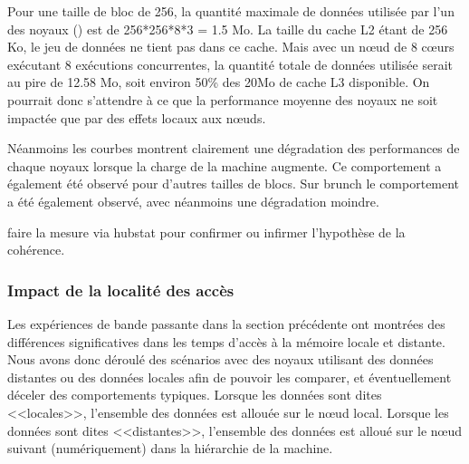 Pour une taille de bloc de 256, la quantité maximale de données utilisée par l'un des noyaux (\gemm) est de 256*256*8*3 = 1.5 Mo. La taille du cache L2 étant de 256 Ko, le jeu de données ne tient pas dans ce cache. Mais avec un nœud de 8 cœurs exécutant 8 exécutions concurrentes, la quantité totale de données utilisée serait au pire de 12.58 Mo, soit environ 50\% des 20Mo de cache L3 disponible.
On pourrait donc s'attendre à ce que la performance moyenne des noyaux ne soit impactée que par des effets locaux aux nœuds.

Néanmoins les courbes montrent clairement une dégradation des performances de chaque noyaux lorsque la charge de la machine augmente.
Ce comportement a également été observé pour d'autres tailles de blocs. Sur brunch le comportement a été également observé, avec néanmoins une dégradation moindre.

\begin{todo}
  faire la mesure via hubstat pour confirmer ou infirmer l'hypothèse de la cohérence.

\end{todo}

\subsubsection{Impact de la localité des accès}\label{sec:contribs:apps:cholesky:locality}

Les expériences de bande passante dans la section précédente ont montrées des différences significatives dans les temps d'accès à la mémoire locale et distante.
Nous avons donc déroulé des scénarios avec des noyaux utilisant des données distantes ou des données locales afin de pouvoir les comparer, et éventuellement déceler des comportements typiques.
Lorsque les données sont dites <<locales>>, l'ensemble des données est allouée sur le nœud local. Lorsque les données sont dites <<distantes>>, l'ensemble des données est alloué sur le nœud suivant (numériquement) dans la hiérarchie de la machine.

